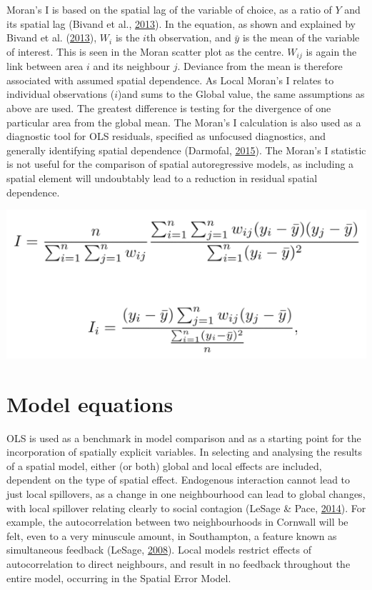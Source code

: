 \documentclass[12pt,twoside]{reedthesis}
\begin{document}
Moran's I is based on the spatial lag of the variable of choice, as a ratio of \(Y\) and its spatial lag (Bivand et al., \protect\hyperlink{ref-bivand2013}{2013}). In the equation, as shown and explained by Bivand et al. (\protect\hyperlink{ref-bivand2013}{2013}), \(W_{i}\) is the \(i\)th observation, and \(\bar{y}\) is the mean of the variable of interest. This is seen in the Moran scatter plot as the centre. \(W_{ij}\) is again the link between area \(i\) and its neighbour \(j\). Deviance from the mean is therefore associated with assumed spatial dependence. As Local Moran's I relates to individual observations (\(i\))and sums to the Global value, the same assumptions as above are used. The greatest difference is testing for the divergence of one particular area from the global mean. The Moran's I calculation is also used as a diagnostic tool for OLS residuals, specified as unfocused diagnostics, and generally identifying spatial dependence (Darmofal, \protect\hyperlink{ref-darmofal2015}{2015}). The Moran's I statistic is not useful for the comparison of spatial autoregressive models, as including a spatial element will undoubtably lead to a reduction in residual spatial dependence.

\includegraphics[width=0.65\linewidth]{figure/Equations}

\hypertarget{model-equations}{%
\section{Model equations}\label{model-equations}}

OLS is used as a benchmark in model comparison and as a starting point for the incorporation of spatially explicit variables. In selecting and analysing the results of a spatial model, either (or both) global and local effects are included, dependent on the type of spatial effect. Endogenous interaction cannot lead to just local spillovers, as a change in one neighbourhood can lead to global changes, with local spillover relating clearly to social contagion (LeSage \& Pace, \protect\hyperlink{ref-lesage2014}{2014}). For example, the autocorrelation between two neighbourhoods in Cornwall will be felt, even to a very minuscule amount, in Southampton, a feature known as simultaneous feedback (LeSage, \protect\hyperlink{ref-lesage2008}{2008}). Local models restrict effects of autocorrelation to direct neighbours, and result in no feedback throughout the entire model, occurring in the Spatial Error Model.\\
\hspace*{0.333em}
\end{document}
